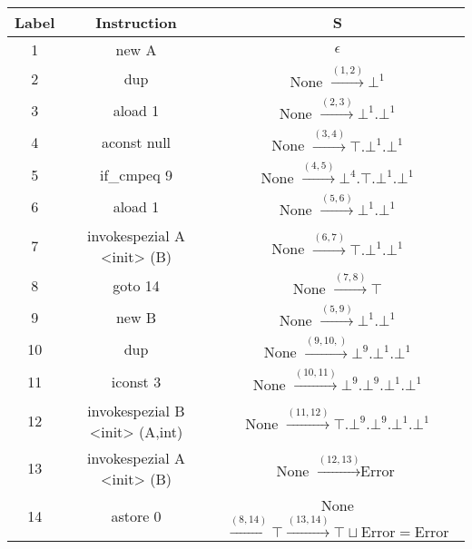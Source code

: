 \documentclass[fleqn,12pt]{article}
\begin{document}
\begin{tabular}{c|c|c}
Label & Instruction & S \\ 
\hline 
1 & new A & $\epsilon$ \\ 
2 & dup & None $\overset{(1,2)}{\rightarrow} \bot^1$ \\ 
3 & aload 1 & None $\overset{(2,3)}{\rightarrow} \bot^1.\bot^1$ \\ 
4 & aconst null & None $\overset{(3,4)}{\rightarrow} \top.\bot^1.\bot^1$\\ 
5 & if\_cmpeq 9 & None $\overset{(4,5)}{\rightarrow} \bot^4.\top.\bot^1.\bot^1$\\ 
6 & aload 1 & None $\overset{(5,6)}{\rightarrow} \bot^1.\bot^1$ \\ 
7 & invokespezial A <init> (B) & None $\overset{(6,7)}{\rightarrow} \top.\bot^1.\bot^1$ \\ 
8 & goto 14 & None $\overset{(7,8)}{\rightarrow} \top$\\  
9 & new B & None $\overset{(5,9)}{\rightarrow} \bot^1.\bot^1$\\  
10 & dup & None $\overset{(9,10,)}{\rightarrow} \bot^9.\bot^1.\bot^1$\\  
11 & iconst 3 & None $\overset{(10,11)}{\rightarrow} \bot^9.\bot^9.\bot^1.\bot^1 $\\ 
12 & invokespezial B <init> (A,int) & None $\overset{(11,12)}{\rightarrow} \top.\bot^9.\bot^9.\bot^1.\bot^1 $\\  
13 & invokespezial A <init> (B) & None $\overset{(12,13)}{\rightarrow} \text{Error}$\\  
14 & astore 0 & None $\overset{(8,14)}{\rightarrow} \top \overset{(13,14)}{\rightarrow} \top \sqcup \text{Error} = \text{Error}$\\ 
\end{tabular} 
\end{document}
